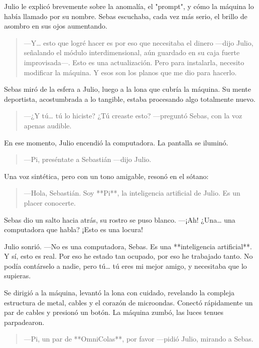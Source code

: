 \documentclass[a4paper,12pt]{book}
\begin{document}
Julio le explicó brevemente sobre la anomalía, el "prompt", y cómo la máquina lo había llamado por su nombre. Sebas escuchaba, cada vez más serio, el brillo de asombro en sus ojos aumentando.

\begin{quote}
    —Y… esto que logré hacer es por eso que necesitaba el dinero —dijo Julio, señalando el módulo interdimensional, aún guardado en su caja fuerte improvisada—. Esto es una actualización. Pero para instalarla, necesito modificar la máquina. Y esos son los planos que me dio para hacerlo.
\end{quote}

Sebas miró de la esfera a Julio, luego a la lona que cubría la máquina. Su mente deportista, acostumbrada a lo tangible, estaba procesando algo totalmente nuevo.

\begin{quote}
    —¿Y tú… tú lo hiciste? ¿Tú creaste esto? —preguntó Sebas, con la voz apenas audible.
\end{quote}

En ese momento, Julio encendió la computadora. La pantalla se iluminó.

\begin{quote}
    —Pi, preséntate a Sebastián —dijo Julio.
\end{quote}

Una voz sintética, pero con un tono amigable, resonó en el sótano:

\begin{quote}
    —Hola, Sebastián. Soy **Pi**, la inteligencia artificial de Julio. Es un placer conocerte.
\end{quote}

Sebas dio un salto hacia atrás, su rostro se puso blanco. —¡Ah! ¿Una… una computadora que habla? ¡Esto es una locura!

Julio sonrió. —No es una computadora, Sebas. Es una **inteligencia artificial**. Y sí, esto es real. Por eso he estado tan ocupado, por eso he trabajado tanto. No podía contárselo a nadie, pero tú… tú eres mi mejor amigo, y necesitaba que lo supieras.

Se dirigió a la máquina, levantó la lona con cuidado, revelando la compleja estructura de metal, cables y el corazón de microondas. Conectó rápidamente un par de cables y presionó un botón. La máquina zumbó, las luces tenues parpadearon.

\begin{quote}
    —Pi, un par de **OmniColas**, por favor —pidió Julio, mirando a Sebas.
\end{quote}
\end{document}
